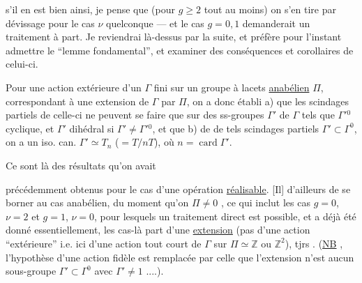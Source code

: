 

 s'il en
est bien ainsi, je pense que (pour $g\geq2$ tout
au moins) on s'en tire par dévissage
pour le cas $\nu$ quelconque --- et le cas $g=0,1$
demanderait  un traitement à part.
Je reviendrai là-dessus par la suite, et
préfère pour l'instant admettre le ``lemme
fondamental'', et examiner des conséquences
et corollaires de celui-ci.

Pour une action extérieure  d'un $\Gamma$ fini
sur un groupe à lacets \uline{anabélien} $\Pi$, 
 correspondant à une extension  de $\Gamma$ par $\Pi$,
on a donc établi a) que les scindages
partiels de celle-ci ne peuvent se faire
que sur des ss-groupes  $\Gamma'$ de $\Gamma$
tels que $\Gamma'{}^0$  cyclique, et $\Gamma'$ dihédral
si $\Gamma'\ne\Gamma'{}^0$, et que b) 
de  de tels scindages partiels
 $\Gamma'\subset\Gamma^0$, on a un iso. can.
$\Gamma'\simeq T_n$ ($=T/nT$), où $n=\operatorname{card}\Gamma'$.

Ce sont là des résultats qu'on avait


précédemment obtenus pour le cas d'une
opération \uline{réalisable}. [Il] 
d'ailleurs de se borner au cas anabélien,
du moment qu'on  $\Pi\ne0$ ,
ce qui inclut les cas $g=0$, $\nu=2$ et
$g=1$, $\nu=0$, pour lesquels un traitement
direct est possible, et a déjà été donné
essentiellement, les cas-là  
part d'une \uline{extension} (pas d'une action
``extérieure'' i.e. ici d'une action tout court
de $\Gamma$ sur $\Pi\simeq\mathbb Z$ ou $\mathbb Z^2$),  tjrs .
(\uline{NB} \uline{}, l'hypothèse d'une
action fidèle est remplacée par celle que
l'extension n'est    aucun
sous-groupe $\Gamma'\subset\Gamma^0$ avec $\Gamma'\ne1$ ....).

